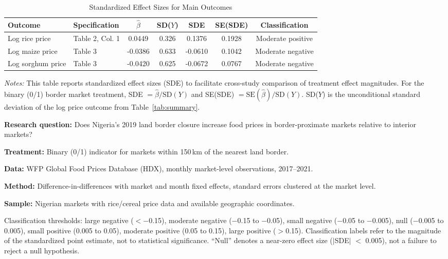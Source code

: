 \begin{table}[H]
\centering
\caption{Standardized Effect Sizes for Main Outcomes}
\label{tab:sde}
\begin{adjustbox}{max width=\textwidth}
\begin{threeparttable}
\begin{tabular}{llccccc}
\toprule
Outcome & Specification & $\hat{\beta}$ & SD($Y$) & SDE & SE(SDE) & Classification \\
\midrule
Log rice price & Table 2, Col. 1 & 0.0449 & 0.326 & 0.1376 & 0.1928 & Moderate positive \\
Log maize price & Table 3 & -0.0386 & 0.633 & -0.0610 & 0.1042 & Moderate negative \\
Log sorghum price & Table 3 & -0.0420 & 0.625 & -0.0672 & 0.0767 & Moderate negative \\
\bottomrule
\end{tabular}
\begin{tablenotes}[flushleft]
\small
\item \emph{Notes:} This table reports standardized effect sizes (SDE) to facilitate cross-study comparison of treatment effect magnitudes. For the binary (0/1) border market treatment, SDE $= \hat{\beta} / \text{SD}(Y)$ and SE(SDE) $= \text{SE}(\hat{\beta}) / \text{SD}(Y)$. SD($Y$) is the unconditional standard deviation of the log price outcome from Table~\ref{tab:summary}.
\item \textbf{Research question:} Does Nigeria's 2019 land border closure increase food prices in border-proximate markets relative to interior markets?
\item \textbf{Treatment:} Binary (0/1) indicator for markets within 150\,km of the nearest land border.
\item \textbf{Data:} WFP Global Food Prices Database (HDX), monthly market-level observations, 2017--2021.
\item \textbf{Method:} Difference-in-differences with market and month fixed effects, standard errors clustered at the market level.
\item \textbf{Sample:} Nigerian markets with rice/cereal price data and available geographic coordinates.
\item Classification thresholds: large negative ($<$$-$0.15), moderate negative ($-$0.15 to $-$0.05), small negative ($-$0.05 to $-$0.005), null ($-$0.005 to 0.005), small positive (0.005 to 0.05), moderate positive (0.05 to 0.15), large positive ($>$0.15). Classification labels refer to the magnitude of the standardized point estimate, not to statistical significance. ``Null'' denotes a near-zero effect size ($|$SDE$|$ $<$ 0.005), not a failure to reject a null hypothesis.
\end{tablenotes}
\end{threeparttable}
\end{adjustbox}
\end{table}

